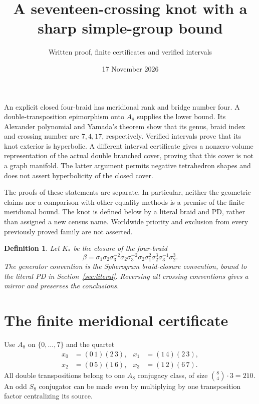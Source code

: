 \documentclass[11pt]{article}
\title{A seventeen-crossing knot with a sharp simple-group bound}
\author{Written proof, finite certificates and verified intervals}
\date{17 November 2026}
\newtheorem{definition}[theorem]{Definition}
\begin{document}
\maketitle

An explicit closed four-braid has meridional rank and bridge number four.
A double-transposition epimorphism onto $A_8$ supplies the lower bound.
Its Alexander polynomial and Yamada's theorem show that its genus,
braid index and crossing number are $7,4,17$, respectively. Verified
intervals prove that its knot exterior is hyperbolic. A different
interval certificate gives a nonzero-volume representation of the
actual double branched cover, proving that this cover is not a graph
manifold. The latter argument permits negative tetrahedron shapes
and does not assert hyperbolicity of the closed cover.

The proofs of these statements are separate. In particular, neither
the geometric claims nor a comparison with other equality methods is
a premise of the finite meridional bound. The knot is defined below
by a literal braid and PD, rather than assigned a new census name.
Worldwide priority and exclusion from every previously proved family
are not asserted.

\begin{definition}\label{def:knot}
Let $K_*$ be the closure of the four-braid
\[
 \beta=\sigma_1\sigma_2\sigma_3^{-2}\sigma_2\sigma_3^{-2}
        \sigma_2\sigma_1^2\sigma_2^3\sigma_3^{-1}\sigma_2^3.
\]
The generator convention is the Spherogram braid-closure convention,
bound to the literal PD in Section~\ref{sec:literal}. Reversing all
crossing conventions gives a mirror and preserves the conclusions.
\end{definition}

\section{The finite meridional certificate}

Use $A_8$ on $\{0,\ldots,7\}$ and the quartet
\[
\begin{aligned}
 x_0&=(0\,1)(2\,3),&x_1&=(1\,4)(2\,3),\\
 x_2&=(0\,5)(1\,6),&x_3&=(1\,2)(6\,7).
\end{aligned}
\]
All double transpositions belong to one $A_8$ conjugacy class, of size
$\binom84\cdot3=210$. An odd $S_8$ conjugator can be made even by
multiplying by one transposition factor centralizing its source.
\end{document}
